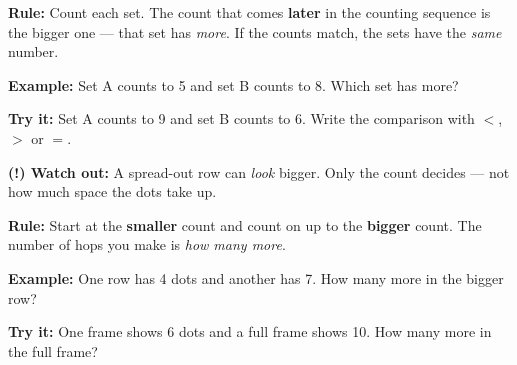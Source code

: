 \documentclass[12pt]{article}
\begin{document}


\begin{formulabox}
\textbf{Rule:} Count each set. The count that comes \textbf{later} in the
counting sequence is the bigger one --- that set has \emph{more}. If the
counts match, the sets have the \emph{same} number.
\end{formulabox}

\begin{examplebox}
\textbf{Example:} \quad Set A counts to 5 and set B counts to 8. Which set has
more?
\end{examplebox}

\begin{tryitbox}
\textbf{Try it:} \quad Set A counts to 9 and set B counts to 6. Write the
comparison with $<$, $>$ or $=$.\\[2pt]
\end{tryitbox}

\begin{watchoutbox}
\textbf{(!) Watch out:} A spread-out row can \emph{look} bigger. Only the
count decides --- not how much space the dots take up.
\end{watchoutbox}


\begin{formulabox}
\textbf{Rule:} Start at the \textbf{smaller} count and count on up to the
\textbf{bigger} count. The number of hops you make is \emph{how many more}.
\end{formulabox}

\begin{examplebox}
\textbf{Example:} \quad One row has 4 dots and another has 7. How many more in
the bigger row?
\end{examplebox}

\begin{tryitbox}
\textbf{Try it:} \quad One frame shows 6 dots and a full frame shows 10. How
many more in the full frame?\\[2pt]
\end{tryitbox}
\end{document}

